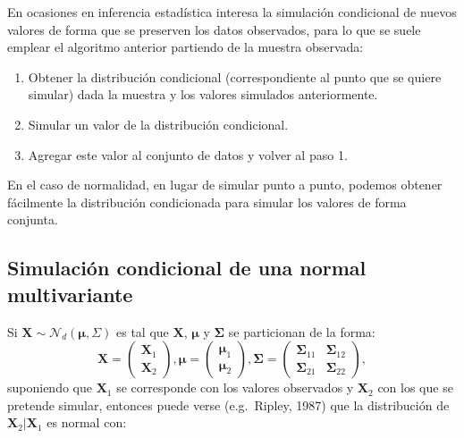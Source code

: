 \documentclass[
]{book}
\theoremstyle{break}
\theoremstyle{definition}
\theoremstyle{definition}
\theoremstyle{definition}
\theoremstyle{remark}
\let\BeginKnitrBlock\begin \let\EndKnitrBlock\end
\begin{document}
En ocasiones en inferencia estadística interesa la simulación condicional de nuevos valores de forma que se preserven los datos observados, para lo que se suele emplear el algoritmo anterior partiendo de la muestra observada:

\BeginKnitrBlock{conjecture}[de simulación condicional]
\protect\hypertarget{cnj:cond-incond}{}{\label{cnj:cond-incond} {} }

\begin{enumerate}
\def\labelenumi{\arabic{enumi}.}
\item
  Obtener la distribución condicional (correspondiente al punto
  que se quiere simular) dada la muestra y los valores simulados
  anteriormente.
\item
  Simular un valor de la distribución condicional.
\item
  Agregar este valor al conjunto de datos y volver al paso 1.
\end{enumerate}
\EndKnitrBlock{conjecture}

En el caso de normalidad, en lugar de simular punto a punto,
podemos obtener fácilmente la distribución condicionada
para simular los valores de forma conjunta.

\hypertarget{condnormal}{%
\subsection{Simulación condicional de una normal multivariante}\label{condnormal}}

Si \(\mathbf{X} \sim \mathcal{N}_d\left( \boldsymbol\mu,\Sigma \right)\) es tal que \(\mathbf{X}\), \(\boldsymbol\mu\) y \(\boldsymbol\Sigma\) se particionan de la forma:
\[\mathbf{X} =
\begin{pmatrix}
 \mathbf{X}_1 \\
 \mathbf{X}_2
\end{pmatrix},  
\boldsymbol\mu =
\begin{pmatrix}
 \boldsymbol\mu_1 \\
 \boldsymbol\mu_2
\end{pmatrix}, 
\boldsymbol\Sigma =
\begin{pmatrix}
 \boldsymbol\Sigma_{11} & \boldsymbol\Sigma_{12} \\
 \boldsymbol\Sigma_{21} & \boldsymbol\Sigma_{22}
\end{pmatrix},\]
suponiendo que \(\mathbf{X}_1\) se corresponde con los valores observados y \(\mathbf{X}_2\) con los que se pretende simular,
entonces puede verse (e.g.~Ripley, 1987) que la distribución de \(\mathbf{X}_2 | \mathbf{X}_1\) es normal con:
\end{document}
